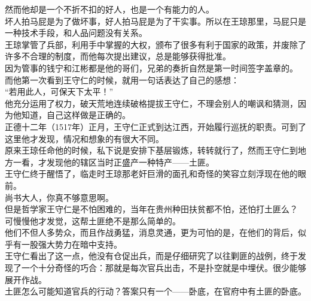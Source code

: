 \begin{multicols}{\theparacolNo}
然而他却是一个不折不扣的好人，也是一个有能力的人。\\

坏人拍马屁是为了做坏事，好人拍马屁是为了干实事。所以在王琼那里，马屁只是一种技术手段，和人品问题没有关系。\\

王琼掌管了兵部，利用手中掌握的大权，颁布了很多有利于国家的政策，并废除了许多不合理的制度，而他每次提出建议，总是能够获得批准。\\

因为管事的钱宁和江彬都是他的哥们，兄弟的奏折自然是第一时间签字盖章的。\\

而他第一次看到王守仁的时候，就用一句话表达了自己的感想：\\

“若用此人，可保天下太平！”\\

他充分运用了权力，破天荒地连续破格提拔王守仁，不理会别人的嘲讽和猜测，因为他知道，自己这样做是正确的。\\

正德十二年（1517年）正月，王守仁正式到达江西，开始履行巡抚的职责。可到了这里他才发现，情况和想象的有很大不同。\\

原来王琼任命他的时候，私下说是安排下基层锻炼，转转就行了，然而王守仁到地方一看，才发现他的辖区当时正盛产一种特产——土匪。\\

王守仁终于醒悟了，临走时王琼那老奸巨滑的面孔和奇怪的笑容立刻浮现在他的眼前。\\

尚书大人，你真不够意思啊。\\

但是哲学家王守仁是不怕困难的，当年在贵州种田扶贫都不怕，还怕打土匪么？\\

可慢慢他才发觉，这帮土匪绝不是那么简单的。\\

他们不但人多势众，而且作战勇猛，消息灵通，更为可怕的是，在他们的背后，似乎有一股强大势力在暗中支持。\\

王守仁看出了这一点，他没有仓促出兵，而是仔细研究了以往剿匪的战例，终于发现了一个十分奇怪的巧合：那就是每次官兵出击，不是扑空就是中埋伏。很少能够展开作战。\\

土匪怎么可能知道官兵的行动？答案只有一个——卧底，在官府中有土匪的卧底。\\


\end{multicols}

